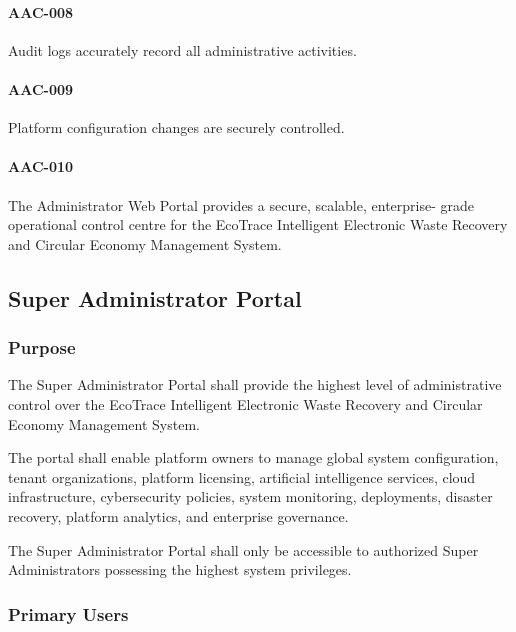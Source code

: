 \paragraph{AAC-008}

Audit logs accurately record all administrative activities.

\paragraph{AAC-009}

Platform configuration changes are securely controlled.

\paragraph{AAC-010}

The Administrator Web Portal provides a secure, scalable, enterprise-
grade operational control centre for the EcoTrace Intelligent
Electronic Waste Recovery and Circular Economy Management System.

\subsection{Super Administrator Portal}

\subsubsection*{Purpose}

The Super Administrator Portal shall provide the highest level of
administrative control over the EcoTrace Intelligent Electronic Waste
Recovery and Circular Economy Management System.

The portal shall enable platform owners to manage global system
configuration, tenant organizations, platform licensing, artificial
intelligence services, cloud infrastructure, cybersecurity policies,
system monitoring, deployments, disaster recovery, platform analytics,
and enterprise governance.

The Super Administrator Portal shall only be accessible to authorized
Super Administrators possessing the highest system privileges.


\subsubsection*{Primary Users}

